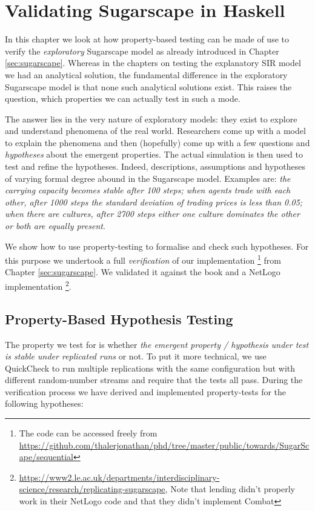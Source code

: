 \chapter{Validating Sugarscape in Haskell}
\label{app:validating_sugarscape}

In this chapter we look at how property-based testing can be made of use to verify the \textit{exploratory} Sugarscape model \cite{epstein_growing_1996} as already introduced in Chapter \ref{sec:sugarscape}. Whereas in the chapters on testing the explanatory SIR model we had an analytical solution, the fundamental difference in the exploratory Sugarscape model is that none such analytical solutions exist. This raises the question, which properties we can actually test in such a mode.

The answer lies in the very nature of exploratory models: they exist to explore and understand phenomena of the real world. Researchers come up with a model to explain the phenomena and then (hopefully) come up with a few questions and  \textit{hypotheses} about the emergent properties. The actual simulation is then used to test and refine the hypotheses. Indeed, descriptions, assumptions and hypotheses of varying formal degree abound in the Sugarscape model. Examples are: \textit{the carrying capacity becomes stable after 100 steps; when agents trade with each other, after 1000 steps the standard deviation of trading prices is less than 0.05; when there are cultures, after 2700 steps either one culture dominates the other or both are equally present}. 

We show how to use property-testing to formalise and check such hypotheses. For this purpose we undertook a full \textit{verification} of our implementation \footnote{The code can be accessed freely from \url{https://github.com/thalerjonathan/phd/tree/master/public/towards/SugarScape/sequential}} from Chapter \ref{sec:sugarscape}. We validated it against the book \cite{epstein_growing_1996} and a NetLogo implementation \cite{weaver_replicating_2009} \footnote{\url{https://www2.le.ac.uk/departments/interdisciplinary-science/research/replicating-sugarscape}, Note that lending didn't properly work in their NetLogo code and that they didn't implement Combat}. 

\section{Property-Based Hypothesis Testing}
The property we test for is whether \textit{the emergent property / hypothesis under test is stable under replicated runs} or not. To put it more technical, we use QuickCheck to run multiple replications with the same configuration but with different random-number streams and require that the tests all pass. During the verification process we have derived and implemented property-tests for the following hypotheses:

